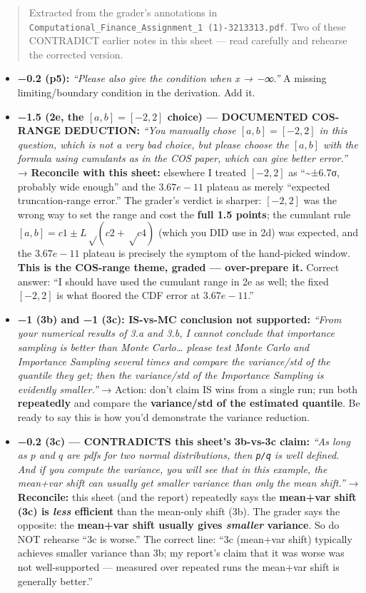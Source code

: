 \documentclass[
  11pt,
]{article}
\begin{document}
\begin{quote}
Extracted from the grader's annotations in
\texttt{Computational\_Finance\_Assignment\_1\ (1)-3213313.pdf}. Two of
these CONTRADICT earlier notes in this sheet --- read carefully and
rehearse the corrected version.
\end{quote}

\begin{itemize}
\item
  \textbf{−0.2 (p5):} \emph{``Please also give the condition when x →
  −∞.''} A missing limiting/boundary condition in the derivation. Add
  it.
\item
  \textbf{−1.5 (2e, the \([a,b] = [−2,2]\) choice) --- DOCUMENTED
  COS-RANGE DEDUCTION:} \emph{``You manually chose \([a,b] = [−2,2]\) in
  this question, which is not a very bad choice, but please choose the
  \([a,b]\) with the formula using cumulants as in the COS paper, which
  can give better error.''} → \textbf{Reconcile with this sheet:}
  elsewhere I treated \([−2,2]\) as ``\textasciitilde±6.7σ, probably
  wide enough'' and the \(3.67e-11\) plateau as merely ``expected
  truncation-range error.'' The grader's verdict is sharper: \([−2,2]\)
  was the wrong way to set the range and cost the \textbf{full 1.5
  points}; the cumulant rule \([a,b] = c1 ± L√(c2+√c4)\) (which you DID
  use in 2d) was expected, and the \(3.67e-11\) plateau is precisely the
  symptom of the hand-picked window. \textbf{This is the COS-range
  theme, graded --- over-prepare it.} Correct answer: ``I should have
  used the cumulant range in 2e as well; the fixed \([−2,2]\) is what
  floored the CDF error at \(3.67e-11\).''
\item
  \textbf{−1 (3b) and −1 (3c): IS-vs-MC conclusion not supported:}
  \emph{``From your numerical results of 3.a and 3.b, I cannot conclude
  that importance sampling is better than Monte Carlo\ldots{} please
  test Monte Carlo and Importance Sampling several times and compare the
  variance/std of the quantile they get; then the variance/std of the
  Importance Sampling is evidently smaller.''} → Action: don't claim IS
  wins from a single run; run both \textbf{repeatedly} and compare the
  \textbf{variance/std of the estimated quantile}. Be ready to say this
  is how you'd demonstrate the variance reduction.
\item
  \textbf{−0.2 (3c) --- CONTRADICTS this sheet's 3b-vs-3c claim:}
  \emph{``As long as \(p\) and \(q\) are pdfs for two normal
  distributions, then \texttt{p/q} is well defined. And if you compute
  the variance, you will see that in this example, the mean+var shift
  can usually get smaller variance than only the mean shift.''} →
  \textbf{Reconcile:} this sheet (and the report) repeatedly says the
  \textbf{mean+var shift (3c) is \emph{less} efficient} than the
  mean-only shift (3b). The grader says the opposite: the
  \textbf{mean+var shift usually gives \emph{smaller} variance}. So do
  NOT rehearse ``3c is worse.'' The correct line: ``3c (mean+var shift)
  typically achieves smaller variance than 3b; my report's claim that it
  was worse was not well-supported --- measured over repeated runs the
  mean+var shift is generally better.''
\end{itemize}
\end{document}
